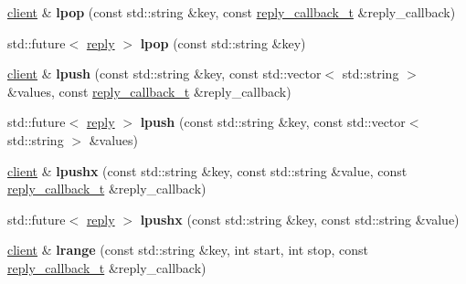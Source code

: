 \begin{DoxyCompactItemize}
\hyperlink{classcpp__redis_1_1client}{client} \& {\bfseries lpop} (const std\+::string \&key, const \hyperlink{classcpp__redis_1_1client_a061a1140d36d2eaeda82b09a0bb3f9f2}{reply\+\_\+callback\+\_\+t} \&reply\+\_\+callback)
\item 
\mbox{\label{classcpp__redis_1_1client_ab6ebbc7b2e6f43f2b5607a4b5471694e}} 
std\+::future$<$ \hyperlink{classcpp__redis_1_1reply}{reply} $>$ {\bfseries lpop} (const std\+::string \&key)
\item 
\mbox{\label{classcpp__redis_1_1client_a0dd04ea38709dd51ae5f39de62d01c70}} 
\hyperlink{classcpp__redis_1_1client}{client} \& {\bfseries lpush} (const std\+::string \&key, const std\+::vector$<$ std\+::string $>$ \&values, const \hyperlink{classcpp__redis_1_1client_a061a1140d36d2eaeda82b09a0bb3f9f2}{reply\+\_\+callback\+\_\+t} \&reply\+\_\+callback)
\item 
\mbox{\label{classcpp__redis_1_1client_ac5859a6b63200a4a79574187a7155feb}} 
std\+::future$<$ \hyperlink{classcpp__redis_1_1reply}{reply} $>$ {\bfseries lpush} (const std\+::string \&key, const std\+::vector$<$ std\+::string $>$ \&values)
\item 
\mbox{\label{classcpp__redis_1_1client_ab0a9a2b92f53f774ce4e345b42a403d0}} 
\hyperlink{classcpp__redis_1_1client}{client} \& {\bfseries lpushx} (const std\+::string \&key, const std\+::string \&value, const \hyperlink{classcpp__redis_1_1client_a061a1140d36d2eaeda82b09a0bb3f9f2}{reply\+\_\+callback\+\_\+t} \&reply\+\_\+callback)
\item 
\mbox{\label{classcpp__redis_1_1client_af9a3e05f5bd6d4ebb3138dc09f8d0d4e}} 
std\+::future$<$ \hyperlink{classcpp__redis_1_1reply}{reply} $>$ {\bfseries lpushx} (const std\+::string \&key, const std\+::string \&value)
\item 
\mbox{\label{classcpp__redis_1_1client_a9e85cce8555274f7bc706a13911b4579}} 
\hyperlink{classcpp__redis_1_1client}{client} \& {\bfseries lrange} (const std\+::string \&key, int start, int stop, const \hyperlink{classcpp__redis_1_1client_a061a1140d36d2eaeda82b09a0bb3f9f2}{reply\+\_\+callback\+\_\+t} \&reply\+\_\+callback)
\item 

\end{DoxyCompactItemize}
